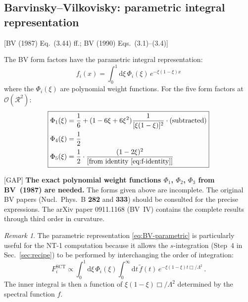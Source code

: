 \documentclass[12pt,a4paper]{article}
\theoremstyle{definition}
\theoremstyle{remark}
\newtheorem{remark}[proposition]{Remark}
\newcommand{\dd}{\mathrm{d}}
\newcommand{\fromlit}[1]{\textcolor{blue!70!black}{\textsf{[#1]}}}
\newcommand{\gap}{\textcolor{red!80!black}{\textsf{[GAP]}}}
\begin{document}
\subsection{Barvinsky--Vilkovisky: parametric integral representation}

\fromlit{BV (1987) Eq.~(3.44) ff.; BV (1990) Eqs.~(3.1)--(3.4)}

The BV form factors have the parametric integral representation:
\begin{equation}
  f_i(x) = \int_0^1\dd\xi\,\Phi_i(\xi)\,e^{-\xi(1-\xi)x}
  \label{eq:BV-parametric}
\end{equation}
where the $\Phi_i(\xi)$ are polynomial weight functions.  For the
five form factors at $\mathcal{O}(\mathcal{R}^2)$:
\begin{equation}
  \boxed{
  \begin{aligned}
  \Phi_1(\xi) &= \frac{1}{6} + (1-6\xi+6\xi^2)\frac{1}{[\xi(1-\xi)]^2}
    \cdot\text{(subtracted)}\\
  \Phi_4(\xi) &= \frac{1}{2}\\
  \Phi_5(\xi) &= \frac{1}{2}\cdot\frac{(1-2\xi)^2}{[\text{from identity \eqref{eq:f-identity}}]}
  \end{aligned}
  }
  \label{eq:BV-weights}
\end{equation}

\gap\; \textbf{The exact polynomial weight functions $\Phi_1$, $\Phi_2$,
$\Phi_3$ from BV~(1987) are needed.}  The forms given above are
incomplete.  The original BV papers (Nucl.\ Phys.\ B \textbf{282}
and \textbf{333}) should be consulted for the precise expressions.
The arXiv paper 0911.1168 (BV~IV) contains the complete results
through third order in curvature.

\begin{remark}
The parametric representation \eqref{eq:BV-parametric} is particularly
useful for the NT-1 computation because it allows the $s$-integration
(Step~4 in Sec.~\ref{sec:recipe}) to be performed by interchanging
the order of integration:
\begin{equation}
  F_i^{\text{SCT}} \propto \int_0^1\dd\xi\,\Phi_i(\xi)
  \int_0^\infty\dd t\,\tilde{f}(t)\,e^{-\xi(1-\xi)t\Box/\Lambda^2}\,.
  \label{eq:interchange}
\end{equation}
The inner integral is then a function of $\xi(1-\xi)\Box/\Lambda^2$
determined by the spectral function $f$.
\end{remark}


\newpage
\end{document}
